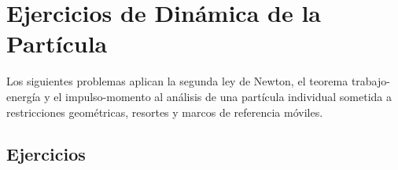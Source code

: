 
\section{Ejercicios de Dinámica de la Partícula}

Los siguientes problemas aplican la segunda ley de Newton, el teorema
trabajo-energía y el impulso-momento al análisis de una partícula individual
sometida a restricciones geométricas, resortes y marcos de referencia móviles.

\subsection{Ejercicios}

